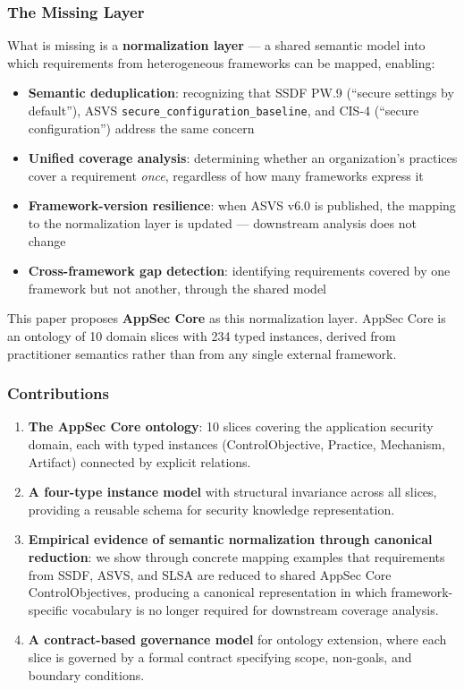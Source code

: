 \documentclass[
]{article}
\providecommand{\tightlist}{%
  \setlength{\itemsep}{0pt}\setlength{\parskip}{0pt}}
\begin{document}
\subsubsection{The Missing Layer}\label{the-missing-layer}

What is missing is a \textbf{normalization layer} --- a shared semantic
model into which requirements from heterogeneous frameworks can be
mapped, enabling:

\begin{itemize}
\tightlist
\item
  \textbf{Semantic deduplication}: recognizing that SSDF PW.9 (``secure
  settings by default''), ASVS \texttt{secure\_configuration\_baseline},
  and CIS-4 (``secure configuration'') address the same concern
\item
  \textbf{Unified coverage analysis}: determining whether an
  organization's practices cover a requirement \emph{once}, regardless
  of how many frameworks express it
\item
  \textbf{Framework-version resilience}: when ASVS v6.0 is published,
  the mapping to the normalization layer is updated --- downstream
  analysis does not change
\item
  \textbf{Cross-framework gap detection}: identifying requirements
  covered by one framework but not another, through the shared model
\end{itemize}

This paper proposes \textbf{AppSec Core} as this normalization layer.
AppSec Core is an ontology of 10 domain slices with 234 typed instances,
derived from practitioner semantics rather than from any single external
framework.

\subsubsection{Contributions}\label{contributions}

\begin{enumerate}
\def\labelenumi{\arabic{enumi}.}
\item
  \textbf{The AppSec Core ontology}: 10 slices covering the application
  security domain, each with typed instances (ControlObjective,
  Practice, Mechanism, Artifact) connected by explicit relations.
\item
  \textbf{A four-type instance model} with structural invariance across
  all slices, providing a reusable schema for security knowledge
  representation.
\item
  \textbf{Empirical evidence of semantic normalization through canonical
  reduction}: we show through concrete mapping examples that
  requirements from SSDF, ASVS, and SLSA are reduced to shared AppSec
  Core ControlObjectives, producing a canonical representation in which
  framework-specific vocabulary is no longer required for downstream
  coverage analysis.
\item
  \textbf{A contract-based governance model} for ontology extension,
  where each slice is governed by a formal contract specifying scope,
  non-goals, and boundary conditions.
\end{enumerate}
\end{document}
